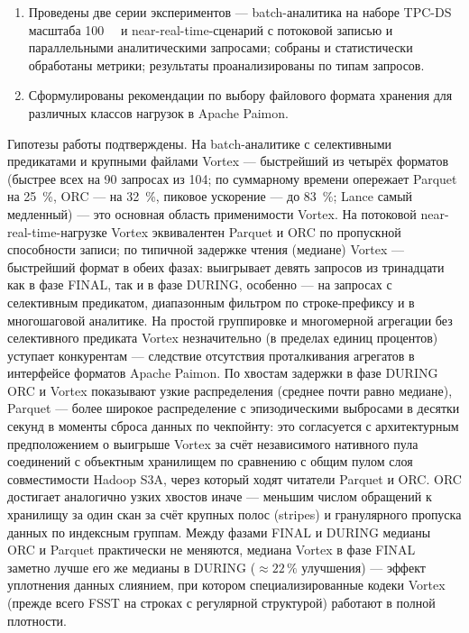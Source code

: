 \begin{enumerate}
        средствами Ansible (Apache Flink, Apache Paimon с модулем
        \texttt{paimon-vortex}, объектное хранилище); автоматизированы развёртывание,
        обновление конфигурации, запуск заданий, сбор метрик, управление жизненным
        циклом кластера.
    \item Проведены две серии экспериментов --- batch-аналитика на наборе TPC-DS
        масштаба \SI{100}{\giga\byte} и near-real-time-сценарий с потоковой записью и
        параллельными аналитическими запросами; собраны и статистически обработаны
        метрики; результаты проанализированы по типам запросов.
    \item Сформулированы рекомендации по выбору файлового формата хранения для
        различных классов нагрузок в Apache Paimon.
\end{enumerate}

Гипотезы работы подтверждены. На batch-аналитике с селективными предикатами и
крупными файлами Vortex --- быстрейший из четырёх форматов (быстрее всех на
\num{90} запросах из \num{104}; по суммарному времени опережает Parquet на
\SI{25}{\percent}, ORC --- на \SI{32}{\percent}, пиковое ускорение --- до
\SI{83}{\percent}; Lance самый медленный) --- это основная область применимости
Vortex. На потоковой
near-real-time-нагрузке Vortex эквивалентен Parquet и ORC по пропускной способности
записи; по типичной задержке чтения (медиане) Vortex --- быстрейший формат в обеих
фазах: выигрывает девять запросов из тринадцати как в фазе FINAL, так и в фазе
DURING, особенно --- на запросах с селективным предикатом, диапазонным фильтром по
строке-префиксу и в многошаговой аналитике. На простой группировке и многомерной
агрегации без селективного предиката Vortex незначительно (в пределах единиц
процентов) уступает конкурентам --- следствие отсутствия проталкивания агрегатов в
интерфейсе форматов Apache Paimon. По хвостам задержки в фазе DURING ORC и Vortex
показывают узкие распределения (среднее почти равно медиане), Parquet --- более
широкое распределение с эпизодическими выбросами в десятки секунд в моменты сброса
данных по чекпойнту: это согласуется с архитектурным предположением о выигрыше
Vortex за счёт независимого нативного пула соединений с объектным хранилищем по
сравнению с общим пулом слоя совместимости Hadoop S3A, через который ходят
читатели Parquet и ORC. ORC достигает аналогично узких хвостов иначе ---
меньшим числом обращений к хранилищу за один скан за счёт крупных полос (stripes)
и гранулярного пропуска данных по индексным группам. Между фазами FINAL
и DURING медианы ORC и Parquet практически не меняются, медиана Vortex в фазе
FINAL заметно лучше его же медианы в DURING ($\approx 22\,\%$ улучшения) ---
эффект уплотнения данных слиянием, при котором специализированные кодеки Vortex
(прежде всего FSST на строках с регулярной структурой) работают в полной
плотности.

